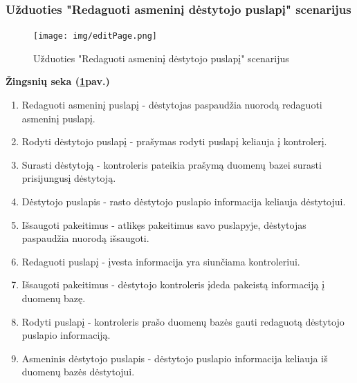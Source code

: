 \documentclass{VUMIFPSkursinis}
\begin{document}
\subsubsection{Užduoties "Redaguoti asmeninį dėstytojo puslapį" scenarijus}
\begin{figure}[H]
	\centering
	\texttt{[image: img/editPage.png]}
	\caption{Užduoties  "Redaguoti asmeninį dėstytojo puslapį" scenarijus}
	\label{fig:editPage}
\end{figure}
\textbf{Žingsnių seka (\ref{fig:editPage}pav.)}\\
\begin{enumerate}
	\item Redaguoti asmeninį puslapį - dėstytojas paspaudžia nuorodą redaguoti asmeninį puslapį.
	\item Rodyti dėstytojo puslapį - prašymas rodyti puslapį keliauja į kontrolerį.
	\item Surasti dėstytoją - kontroleris pateikia prašymą duomenų bazei surasti prisijungusį dėstytoją.
	\item Dėstytojo puslapis - rasto dėstytojo puslapio informacija keliauja dėstytojui.
	\item Išsaugoti pakeitimus - atlikęs pakeitimus savo puslapyje, dėstytojas paspaudžia nuorodą išsaugoti.
	\item Redaguoti puslapį - įvesta informacija yra siunčiama kontroleriui.
	\item Išsaugoti pakeitimus - dėstytojo kontroleris įdeda pakeistą informaciją į duomenų bazę.
	\item Rodyti puslapį - kontroleris prašo duomenų bazės gauti redaguotą dėstytojo puslapio informaciją.
	\item Asmeninis dėstytojo puslapis - dėstytojo puslapio informacija keliauja iš duomenų bazės dėstytojui.
\end{enumerate}
\end{document}
